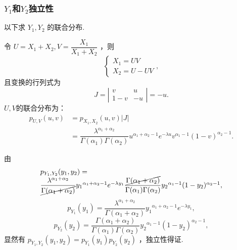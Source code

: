 \begin{frame}[t,allowframebreaks]
    \frametitle{$Y_1$和$Y_2$独立性}
        以下求 $Y_1,Y_2$ 的联合分布.

        令 $U=X_1+X_2,V=\dfrac{X_1}{X_1+X_2}$ ，则 
        \[
            \left\{ \begin{array}{ll} X_{1}=UV \\ X_{2}=U-UV \end{array}\right., 
        \]
        且变换的行列式为 
        \[
            J= \left | \begin{array}{ccc} v & u \\ 1-v & -u \end{array} \right |=-u. 
        \]
        $U,V $的联合分布为：
        \[
            \begin{aligned} p_{U,V}(u,v)&=p_{X_1,X_2}(u,v)|J| \\ &=\dfrac{\lambda^{\alpha_1+\alpha_2}}{\Gamma(\alpha_1)\Gamma(\alpha_2)}{u}^{\alpha_1+\alpha_2-1}e^{-\lambda u} {v}^{\alpha_1-1}(1-v)^{\alpha_2-1}. \end{aligned}
        \]

        由
        \[
            \begin{array}{l}
                p_{Y_1,Y_2}(y_1,y_2)=\\
                \dfrac{\lambda^{\alpha_1+\alpha_2}}{\cancel{\Gamma(\alpha_1+\alpha_2)}}{y_1}^{\alpha_1+\alpha_2-1}e^{-\lambda y_1} \dfrac{\cancel{\Gamma(\alpha_1+\alpha_2)}}{\Gamma(\alpha_1)\Gamma(\alpha_2)}{y_2}^{\alpha_1-1}(1-y_2)^{\alpha_2-1},
            \end{array}
        \]
        \[
                p_{Y_1}(y_1)=\dfrac{\lambda^{\alpha_1+\alpha_2}}{\Gamma(\alpha_1+\alpha_2)}{y_1}^{\alpha_1+\alpha_2-1}e^{-\lambda y_1}, 
        \] 
        \[
                p_{Y_2}(y_2)=\dfrac{\Gamma(\alpha_1+\alpha_2)}{\Gamma(\alpha_1)\Gamma(\alpha_2)}{y_2}^{\alpha_1-1}(1-{y_2})^{\alpha_2-1},
        \]
        显然有 $p_{Y_1,Y_2}(y_1,y_2)=p_{Y_1}(y_1)p_{Y_2}(y_2)$ ，独立性得证.
\end{frame}

